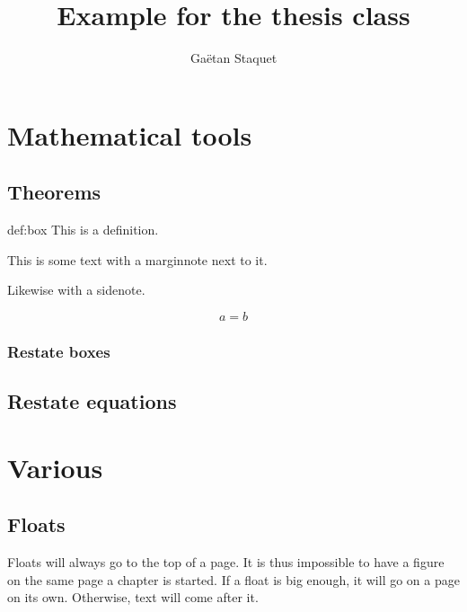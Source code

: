 \documentclass[
  b5paper,
  fontsize = 11pt,
  english,
  openany,
  twoside=false,
  roman equations,
]{thesis}
\title{Example for the thesis class}
\author{Gaëtan Staquet}
\begin{document}
  \frontmatter
  \maketitle

  \mainmatter

  \chapter{Mathematical tools}

  \section{Theorems}

  \begin{definition*}{def:box}
    This is a definition.
  \end{definition*}

  This is some text with a marginnote next to it.

  Likewise with a sidenote.

  \begin{equation}
    a = b
  \end{equation}

  \subsection{Restate boxes}


  \section{Restate equations}

  \chapter{Various}

  \section{Floats}

  Floats will always go to the top of a page.
  It is thus impossible to have a figure on the same page a chapter is started.
  If a float is big enough, it will go on a page on its own.
  Otherwise, text will come after it.
\end{document}
